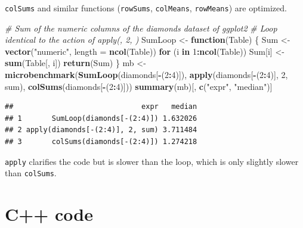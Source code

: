 \documentclass[
  12pt,
  american,
  a4paper,
  extrafontsizes,onecolumn,openright
  ]{memoir}
\newenvironment{Shaded}{\begin{snugshade}}{\end{snugshade}}
\newcommand{\AttributeTok}[1]{\textcolor[rgb]{0.13,0.29,0.53}{#1}}
\newcommand{\CommentTok}[1]{\textcolor[rgb]{0.56,0.35,0.01}{\textit{#1}}}
\newcommand{\ControlFlowTok}[1]{\textcolor[rgb]{0.13,0.29,0.53}{\textbf{#1}}}
\newcommand{\DecValTok}[1]{\textcolor[rgb]{0.00,0.00,0.81}{#1}}
\newcommand{\FunctionTok}[1]{\textcolor[rgb]{0.13,0.29,0.53}{\textbf{#1}}}
\newcommand{\NormalTok}[1]{#1}
\newcommand{\OtherTok}[1]{\textcolor[rgb]{0.56,0.35,0.01}{#1}}
\newcommand{\SpecialCharTok}[1]{\textcolor[rgb]{0.81,0.36,0.00}{\textbf{#1}}}
\newcommand{\StringTok}[1]{\textcolor[rgb]{0.31,0.60,0.02}{#1}}
\begin{document}
\texttt{colSums} and similar functions (\texttt{rowSums}, \texttt{colMeans}, \texttt{rowMeans}) are optimized.

\scriptsize

\begin{Shaded}
\begin{Highlighting}[]
\CommentTok{\# Sum of the numeric columns of the diamonds dataset of ggplot2}
\CommentTok{\# Loop identical to the action of apply(, 2, )}
\NormalTok{SumLoop }\OtherTok{\textless{}{-}} \ControlFlowTok{function}\NormalTok{(Table) \{}
\NormalTok{  Sum }\OtherTok{\textless{}{-}} \FunctionTok{vector}\NormalTok{(}\StringTok{"numeric"}\NormalTok{, }\AttributeTok{length =} \FunctionTok{ncol}\NormalTok{(Table))}
  \ControlFlowTok{for}\NormalTok{ (i }\ControlFlowTok{in} \DecValTok{1}\SpecialCharTok{:}\FunctionTok{ncol}\NormalTok{(Table)) Sum[i] }\OtherTok{\textless{}{-}} \FunctionTok{sum}\NormalTok{(Table[, i])}
  \FunctionTok{return}\NormalTok{(Sum)}
\NormalTok{\}}
\NormalTok{mb }\OtherTok{\textless{}{-}} \FunctionTok{microbenchmark}\NormalTok{(}\FunctionTok{SumLoop}\NormalTok{(diamonds[}\SpecialCharTok{{-}}\NormalTok{(}\DecValTok{2}\SpecialCharTok{:}\DecValTok{4}\NormalTok{)]), }
                     \FunctionTok{apply}\NormalTok{(diamonds[}\SpecialCharTok{{-}}\NormalTok{(}\DecValTok{2}\SpecialCharTok{:}\DecValTok{4}\NormalTok{)], }\DecValTok{2}\NormalTok{, sum), }
                     \FunctionTok{colSums}\NormalTok{(diamonds[}\SpecialCharTok{{-}}\NormalTok{(}\DecValTok{2}\SpecialCharTok{:}\DecValTok{4}\NormalTok{)]))}
\FunctionTok{summary}\NormalTok{(mb)[, }\FunctionTok{c}\NormalTok{(}\StringTok{"expr"}\NormalTok{, }\StringTok{"median"}\NormalTok{)]}
\end{Highlighting}
\end{Shaded}

\begin{verbatim}
##                              expr   median
## 1       SumLoop(diamonds[-(2:4)]) 1.632026
## 2 apply(diamonds[-(2:4)], 2, sum) 3.711484
## 3       colSums(diamonds[-(2:4)]) 1.274218
\end{verbatim}

\normalsize

\texttt{apply} clarifies the code but is slower than the loop, which is only slightly slower than \texttt{colSums}.

\section{C++ code}\label{sec:cpp}
\end{document}
